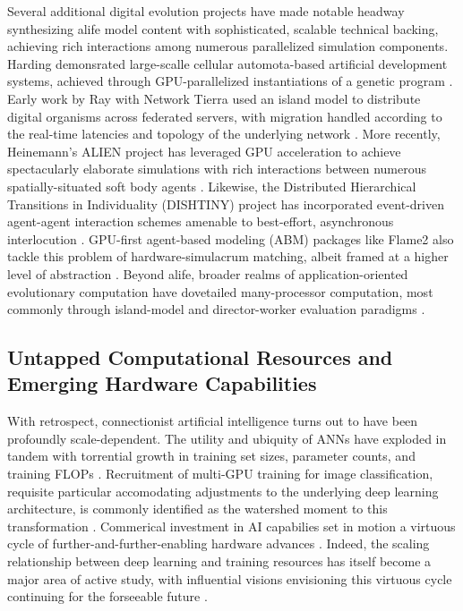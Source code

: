 Several additional digital evolution projects have made notable headway synthesizing alife model content with sophisticated, scalable technical backing, achieving rich interactions among numerous parallelized simulation components.
Harding demonsrated large-scalle cellular automota-based artificial development systems, achieved through GPU-parallelized instantiations of a genetic program  \citep{harding2007fast_ieee}.
Early work by Ray with Network Tierra used an island model to distribute digital organisms across federated servers, with migration  handled according to the real-time latencies and topology of the underlying network \citep{ray1995proposal}.
More recently, Heinemann's ALIEN project has leveraged GPU acceleration to achieve spectacularly elaborate simulations with rich interactions between numerous spatially-situated soft body agents \citep{heinemann2008artificial}.
Likewise, the Distributed Hierarchical Transitions in Individuality (DISHTINY) project has incorporated event-driven agent-agent interaction schemes amenable to best-effort, asynchronous interlocution .
GPU-first agent-based modeling (ABM) packages like Flame2 also tackle this problem of hardware-simulacrum matching, albeit framed at a higher level of abstraction \citep{TODO}.
Beyond alife, broader realms of application-oriented evolutionary computation have dovetailed many-processor computation, most commonly through island-model and director-worker evaluation paradigms \citep{TODO}.

\subsection{Untapped Computational Resources and Emerging Hardware Capabilities}

With retrospect, connectionist artificial intelligence turns out to have been profoundly scale-dependent.
The utility and ubiquity of ANNs have exploded in tandem with torrential growth in training set sizes, parameter counts, and training FLOPs \citep{marcus2018deep}.
Recruitment of multi-GPU training for image classification, requisite particular accomodating adjustments to the underlying deep learning architecture, is commonly identified as the watershed moment to this transformation
 \citep{krizhevsky2012imagenet}.
Commerical investment in AI capabilies set in motion a virtuous cycle of further-and-further-enabling hardware advances \citep{jouppi2017datacenter}.
Indeed, the scaling relationship between deep learning and training resources has itself become a major area of active study, with influential visions envisioning this virtuous cycle continuing for the forseeable future \citep{CITETODOTHATGOOGLEPAPERPREPRINT}.

